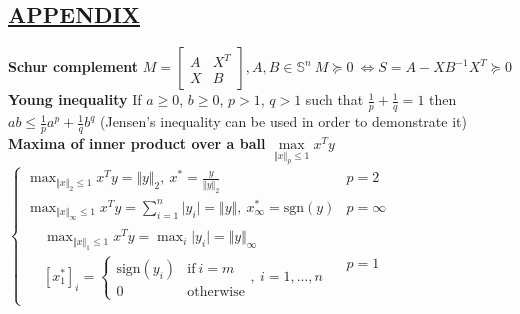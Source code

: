 \documentclass[a4paper]{article}
\begin{document}
\subsection*{\underline{APPENDIX}}
\textbf{Schur complement} $M=\begin{bmatrix}
    A&X^T\\
    X&B
\end{bmatrix}, A,B\in\mathbb{S}^n \ M\succeq0 \  \iff S=A-XB^{-1}X^T\succeq0$  \\
\textbf{Young inequality} If $a\ge0$, $b\ge0$, $p>1$, $q>1$ such that $\frac{1}{p}+\frac{1}{q}=1$ then $ab \le \frac{1}{p}{a^p}+\frac{1}{q}{b^q}$ \textsf{(Jensen's inequality can be used in order to demonstrate it)}\\
\textbf{Maxima of inner product over a ball} $\underset{\Vert x \Vert_p \le 1}{\max} x^Ty$ $\begin{cases}
    \max_{\Vert x \Vert_2\le1}{x^T{y}}=\Vert{y}\Vert_2, \ x^{*}=\frac{y}{\Vert{y}\Vert_2}&{p=2}\\
    \max_{\Vert{x}\Vert_\infty\le1}{x^T{y}}=\sum_{i=1}^{n}{\vert{y_i}\vert}=\Vert{y}\Vert, \ x^{*}_\infty=\text{sgn}(y)&{p=\infty}\\
    \begin{aligned}
        &\max_{\Vert{x}\Vert_1\le{1}}{x^T{y}}=\max_i{\vert{y_i}\vert}=\Vert{y}\Vert_\infty \\
        &[x_1^{*}]_i=\begin{cases}
           \text{sign}(y_i)&\text{if} \ i=m\\
           0&\text{otherwise}
       \end{cases}, \ i=1,...,n
    \end{aligned}&p=1
   
\end{cases}$
\end{document}

